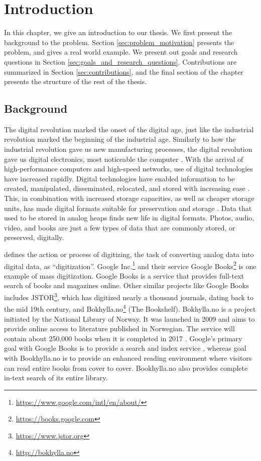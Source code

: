 
\chapter{Introduction}
\label{ch:introduction}
In this chapter, we give an introduction to our thesis. We first present the background to the problem. Section \ref{sec:problem_motivation} presents the problem, and gives a real world example. We present out goals and research questions in Section \ref{sec:goals_and_research_questions}. Contributions are summarized in Section \ref{sec:contributions}, and the final section of the chapter presents the structure of the rest of the thesis.

\section{Background}
The digital revolution marked the onset of the digital age, just like the industrial revolution marked the beginning of the industrial age. Similarly to how the industrial revolution gave us new manufacturing processes, the digital revolution gave us digital electronics, most noticeable the computer \citep{freeman2001time}. With the arrival of high-performance computers and high-speed networks, use of digital technologies have increased rapidly. Digital technologies have enabled information to be created, manipulated, disseminated, relocated, and stored with increasing ease \citep{lee2002state}. This, in combination with increased storage capacities, as well as cheaper storage units, has made digital formats suitable for preservation and storage \citep{morris2003evolution}. Data that used to be stored in analog heaps finds new life in digital formats. Photos, audio, video, and books are just a few types of data that are commonly stored, or preserved, digitally.

\cite{misc-oed-digitization} defines the action or process of digitizing, the task of converting analog data into digital data, as ``digitization''. Google Inc.\footnote{\url{https://www.google.com/intl/en/about/}} and their service Google Books\footnote{\url{https://books.google.com}} is one example of mass digitization. Google Books is a service that provides full-text search of books and magazines online. Other similar projects like Google Books includes JSTOR\footnote{\url{https://www.jstor.org}}, which has digitized nearly a thousand journals, dating back to the mid 19th century, and Bokhylla.no\footnote{\url{http://bokhylla.no}} (The Bookshelf). Bokhylla.no is a project initiated by the National Library of Norway. It was launched in 2009 and aims to provide online access to literature published in Norwegian. The service will contain about 250,000 books when it is completed in 2017 \citep{misc-nb-digial-library}. Google's primary goal with Google Books is to provide a search and index service \citep{coyle2006mass}, whereas goal with Bookhylla.no is to provide an enhanced reading environment where visitors can read entire books from cover to cover. Bookhylla.no also provides complete in-text search of its entire library. 

